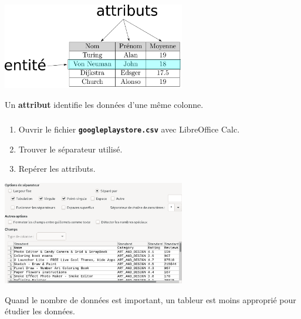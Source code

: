 \documentclass[svgnames,11pt]{beamer}
\begin{document}
\begin{frame}
    \frametitle{}

    \begin{center}
        \centering
        \includegraphics[width=8cm]{ressources/vocabulaire-legende.png}
        \label{IMG}
    \end{center}
    \begin{aretenir}[]
        Un \textbf{attribut} identifie les données d'une même colonne.
    \end{aretenir}

\end{frame}
\begin{frame}
    \frametitle{}

    \begin{activite}
        \begin{enumerate}
            \item Ouvrir le fichier \textbf{\texttt{googleplaystore.csv}} avec LibreOffice Calc.
            \item Trouver le séparateur utilisé.
            \item Repérer les attributs.
        \end{enumerate}
    \end{activite}

\end{frame}
\begin{frame}

    \begin{center}
        \centering
        \includegraphics[width=8cm]{ressources/jeu-donnees.png}
        \label{IMG}
    \end{center}

    \begin{aretenir}[Remarque]
        Quand le nombre de données est important, un tableur est moins approprié pour étudier les données.
    \end{aretenir}
\end{frame}
\end{document}
